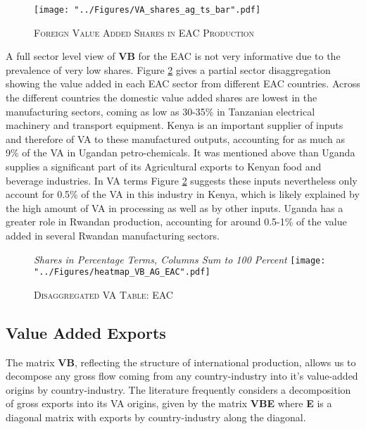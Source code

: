 \documentclass[a4paper]{article}
\begin{document}
\begin{figure}[h!]
\centering
\caption{\label{fig:EACVB_ts_bar}\textsc{Foreign Value Added Shares in EAC Production}}
\texttt{[image: "../Figures/VA\_shares\_ag\_ts\_bar".pdf]} %
\end{figure}
\FloatBarrier

A full sector level view of \textbf{VB} for the EAC is not very informative due to the prevalence of very low shares. Figure \ref{fig:eacVB} gives a partial sector disaggregation showing the value added in each EAC sector from different EAC countries. Across the different countries the domestic value added shares are lowest in the manufacturing sectors, coming as low as 30-35\%  in Tanzanian electrical machinery and transport equipment. Kenya is an important supplier of inputs and therefore of VA to these manufactured outputs, accounting for as much as 9\% of the VA in Ugandan petro-chemicals. It was mentioned above than Uganda supplies a significant part of its Agricultural exports to Kenyan food and beverage industries. In VA terms Figure \ref{fig:eacVB} suggests these inputs nevertheless only account for 0.5\% of the VA in this industry in Kenya, which is likely explained by the high amount of VA in processing as well as by other inputs. Uganda has a greater role in Rwandan production, accounting for around 0.5-1\% of the value added in several Rwandan manufacturing sectors. 

\begin{figure}[h!]
\centering
\caption{\label{fig:eacVB}\textsc{Disaggregated VA Table: EAC}}
\small{\textit{Shares in Percentage Terms, Columns Sum to 100 Percent}}
\texttt{[image: "../Figures/heatmap\_VB\_AG\_EAC".pdf]} %
\end{figure}
\FloatBarrier


\subsection{Value Added Exports}

The matrix \textbf{VB}, reflecting the structure of international production, allows us to decompose any gross flow coming from any country-industry into it's value-added origins by country-industry. The literature frequently considers a decomposition of gross exports into its VA origins, given by the matrix \textbf{VBE} where \textbf{E} is a diagonal matrix with exports by country-industry along the diagonal. %
\end{document}
